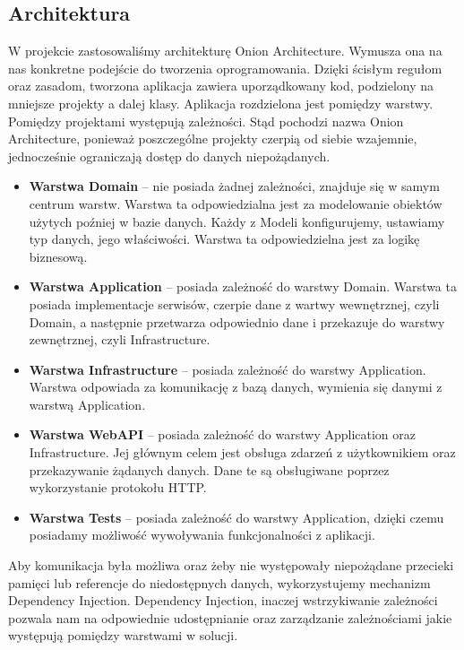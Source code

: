\documentclass[a4paper,twoside,12pt]{book}
\begin{document}
\subsection{Architektura}
W projekcie zastosowaliśmy architekturę Onion Architecture. Wymusza ona na nas konkretne podejście do tworzenia oprogramowania. Dzięki ścisłym regułom oraz zasadom, tworzona aplikacja zawiera uporządkowany kod, podzielony na mniejsze projekty a dalej klasy. Aplikacja rozdzielona jest pomiędzy warstwy. Pomiędzy projektami występują zależności. Stąd pochodzi nazwa Onion Architecture, ponieważ poszczególne projekty czerpią od siebie wzajemnie, jednocześnie ograniczają dostęp do danych niepożądanych. 

\begin{itemize}
    \item \textbf{Warstwa Domain} -- nie posiada żadnej zależności, znajduje się w samym centrum warstw. Warstwa ta odpowiedzialna jest za modelowanie obiektów użytych poźniej w bazie danych. Każdy z Modeli konfigurujemy, ustawiamy typ danych, jego właściwości. Warstwa ta odpowiedzielna jest za logikę biznesową. 
    \item \textbf{Warstwa Application} -- posiada zależność do warstwy Domain. Warstwa ta posiada implementacje serwisów, czerpie dane z wartwy wewnętrznej, czyli Domain, a następnie przetwarza odpowiednio dane i przekazuje do warstwy zewnętrznej, czyli Infrastructure. 
    \item \textbf{Warstwa Infrastructure} -- posiada zależność do warstwy Application. Warstwa odpowiada za komunikację z bazą danych, wymienia się danymi z warstwą Application. 
    \item \textbf{Warstwa WebAPI} -- posiada zależność do warstwy Application oraz Infrastructure. Jej głównym celem jest obsługa zdarzeń z użytkownikiem oraz przekazywanie żądanych danych. Dane te są obsługiwane poprzez wykorzystanie protokołu HTTP. 
    \item \textbf{Warstwa Tests} -- posiada zależność do warstwy Application, dzięki czemu posiadamy możliwość wywoływania funkcjonalności z aplikacji. 
\end{itemize}

Aby komunikacja była możliwa oraz żeby nie występowały niepożądane przecieki pamięci lub referencje do niedostępnych danych, wykorzystujemy mechanizm Dependency Injection. Dependency Injection, inaczej wstrzykiwanie zależności pozwala nam na odpowiednie udostępnianie oraz zarządzanie zależnościami jakie występują pomiędzy warstwami w solucji. 
\end{document}
